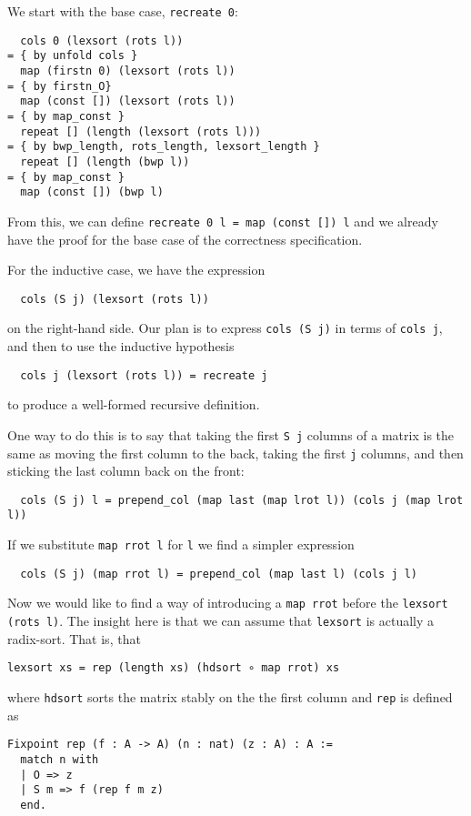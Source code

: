 \documentclass[11pt]{article}
\begin{document}
We start with the base case, \verb|recreate 0|:
\begin{verbatim}
  cols 0 (lexsort (rots l))
= { by unfold cols }
  map (firstn 0) (lexsort (rots l))
= { by firstn_O}
  map (const []) (lexsort (rots l))
= { by map_const }
  repeat [] (length (lexsort (rots l)))
= { by bwp_length, rots_length, lexsort_length }
  repeat [] (length (bwp l))
= { by map_const }
  map (const []) (bwp l)
\end{verbatim}

From this, we can define \verb|recreate 0 l = map (const []) l| and
we already have the proof for the base case of the correctness
specification.

For the inductive case, we have the expression
\begin{verbatim}
  cols (S j) (lexsort (rots l))
\end{verbatim}
on the right-hand side. Our plan is to express \verb|cols (S j)|
in terms of \verb|cols j|, and then to use the inductive hypothesis
\begin{verbatim}
  cols j (lexsort (rots l)) = recreate j
\end{verbatim}
to produce a well-formed recursive definition.

One way to do this is to say that taking the first \verb|S j| columns
of a matrix is the same as moving the first column to the back, taking
the first \verb|j| columns, and then sticking the last column back on
the front:
\begin{verbatim}
  cols (S j) l = prepend_col (map last (map lrot l)) (cols j (map lrot l))
\end{verbatim}
If we substitute \verb|map rrot l| for \verb|l| we find a simpler
expression
\begin{verbatim}
  cols (S j) (map rrot l) = prepend_col (map last l) (cols j l)
\end{verbatim}

Now we would like to find a way of introducing a \verb|map rrot|
before the \verb|lexsort (rots l)|. The insight here is that we can
assume that \verb|lexsort| is actually a radix-sort. That is, that
\begin{verbatim}
lexsort xs = rep (length xs) (hdsort ∘ map rrot) xs
\end{verbatim}
where \verb|hdsort| sorts the matrix stably on the the first column
and \verb|rep| is defined as
\begin{verbatim}
Fixpoint rep (f : A -> A) (n : nat) (z : A) : A :=
  match n with
  | O => z
  | S m => f (rep f m z)
  end.
\end{verbatim}
\end{document}
